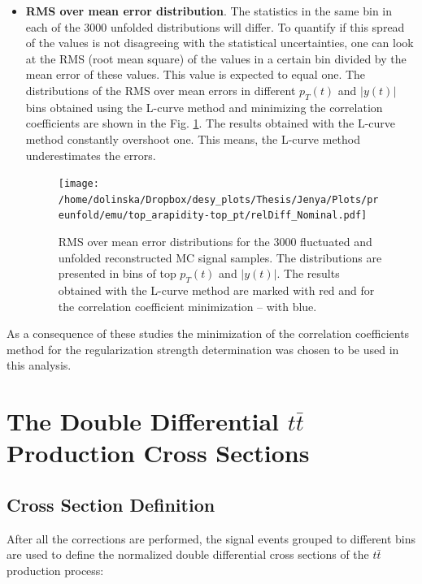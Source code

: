 \begin{itemize}
 \item \textbf{RMS over mean error distribution}. The statistics in the same bin in each of the 3000 unfolded
 distributions will differ. To quantify if this spread of the values is not disagreeing with the statistical uncertainties, one can look at the 
 RMS (root mean square) of the values in a certain bin divided by the mean error of these values. This value is expected to equal one.
 The distributions of the RMS over mean errors in different $p_{T}(t)$ and $|y(t)|$ bins obtained using the L-curve method and minimizing the 
 correlation coefficients are shown in the Fig. \ref{fig:RMSovMeanErr}. The results obtained with the L-curve method
 constantly overshoot one. This means, the L-curve method underestimates the errors.
 \begin{figure}[h]
  \centering
  \texttt{[image: /home/dolinska/Dropbox/desy\_plots/Thesis/Jenya/Plots/preunfold/emu/top\_arapidity-top\_pt/relDiff\_Nominal.pdf]}
  \caption{RMS over mean error distributions for the 3000 fluctuated and unfolded reconstructed MC signal samples. The distributions are
         presented in bins of top $p_{T}(t)$ and $|y(t)|$. The results obtained with the L-curve method are marked with red and 
         for the correlation coefficient minimization -- with blue.}
  \label{fig:RMSovMeanErr}
 \end{figure}

\end{itemize}

As a consequence of these studies the minimization of the correlation coefficients method for the regularization strength determination was chosen
to be used in this analysis.

\section{The Double Differential $t\bar{t}$ Production Cross Sections}

\subsection{Cross Section Definition}

After all the corrections are performed, the signal events grouped to different bins are used to define the normalized double differential cross sections
of the $t\bar{t}$ production process:

